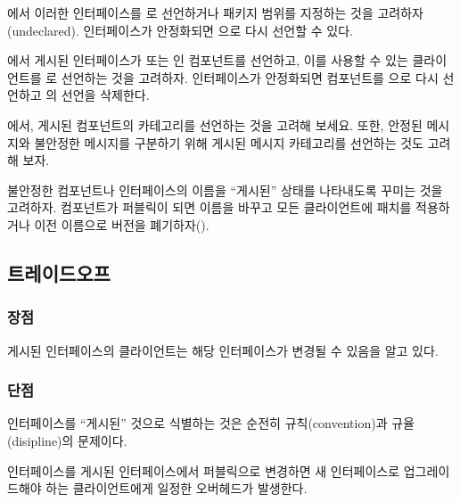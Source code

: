 \documentclass[a4paper,10pt,twoside]{book}
\begin{document}
\begin{bulletlist}
\item {}에서 이러한 인터페이스를 로 선언하거나 패키지 범위를 지정하는 것을 고려하자(undeclared). 인터페이스가 안정화되면 으로 다시 선언할 수 있다.

\item {}에서 게시된 인터페이스가  또는 인 컴포넌트를 선언하고, 이를 사용할 수 있는 클라이언트를 로 선언하는 것을 고려하자. 인터페이스가 안정화되면 컴포넌트를 으로 다시 선언하고 의 선언을 삭제한다.

\item {}에서, 게시된 컴포넌트의 카테고리를 선언하는 것을 고려해 보세요. 또한, 안정된 메시지와 불안정한 메시지를 구분하기 위해 게시된 메시지 카테고리를 선언하는 것도 고려해 보자.

\item 불안정한 컴포넌트나 인터페이스의 이름을 ``게시된'' 상태를 나타내도록 꾸미는 것을 고려하자. 컴포넌트가 퍼블릭이 되면 이름을 바꾸고 모든 클라이언트에 패치를 적용하거나 이전 이름으로 버전을 폐기하자().
\end{bulletlist}

\subsection*{트레이드오프}

\subsubsection*{장점}

\begin{bulletlist}
\item 게시된 인터페이스의 클라이언트는 해당 인터페이스가 변경될 수 있음을 알고 있다.
\end{bulletlist}

\subsubsection*{단점}

\begin{bulletlist}
\item 인터페이스를 ``게시된'' 것으로 식별하는 것은 순전히 규칙(convention)과 규율(disipline)의 문제이다.

\item 인터페이스를 게시된 인터페이스에서 퍼블릭으로 변경하면 새 인터페이스로 업그레이드해야 하는 클라이언트에게 일정한 오버헤드가 발생한다.
\end{bulletlist}
\end{document}
